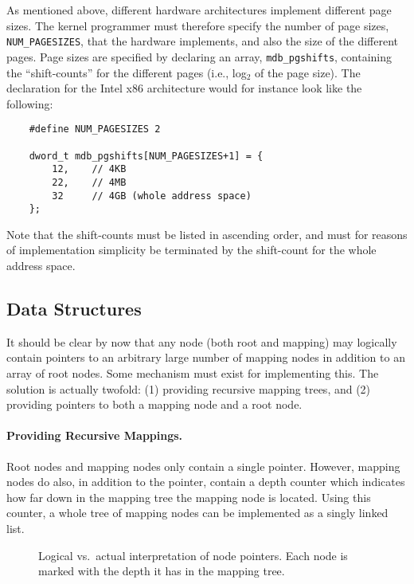 \documentclass[a4paper,twoside]{book}
\begin{document}
As mentioned above, different hardware architectures implement
different page sizes.  The kernel programmer must therefore specify
the number of page sizes, \texttt{NUM\_PAGESIZES}, that the hardware
implements, and also the size of the different pages.  Page sizes are
specified by declaring an array, \texttt{mdb\_pgshifts}, containing
the ``shift-counts'' for the different pages (i.e., log$_2$ of the
page size).  The declaration for the Intel x86 architecture would for
instance look like the following:

{\small
\begin{verbatim}
    #define NUM_PAGESIZES 2

    dword_t mdb_pgshifts[NUM_PAGESIZES+1] = {
        12,    // 4KB
        22,    // 4MB
        32     // 4GB (whole address space)
    };
\end{verbatim}
}

Note that the shift-counts must be listed in ascending order, and must
for reasons of implementation simplicity be terminated by the
shift-count for the whole address space.


\subsection{Data Structures}

It should be clear by now that any node (both root and mapping) may
logically contain pointers to an arbitrary large number of mapping
nodes in addition to an array of root nodes.  Some mechanism must
exist for implementing this.  The solution is actually twofold: (1)
providing recursive mapping trees, and (2) providing pointers to both
a mapping node and a root node.

\paragraph{Providing Recursive Mappings.}

Root nodes and mapping nodes only contain a single pointer.  However,
mapping nodes do also, in addition to the pointer, contain a depth
counter which indicates how far down in the mapping tree the mapping
node is located.  Using this counter, a whole tree of mapping nodes
can be implemented as a singly linked list.

\begin{figure}[tp]
  \begin{center}
    \hspace{1cm}%
    \caption[Logical vs.\ actual interpretation of node
    pointers]{Logical vs.\ actual interpretation of node pointers.
      Each node is marked with the depth it has in the mapping tree.}
    \label{fig:maptree-linking}
  \end{center}
\end{figure}
\end{document}

